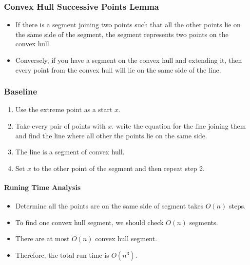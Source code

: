 \subsubsection{Convex Hull Successive Points Lemma}
\begin{itemize}
 \item If there is a segment joining two points such that all the other 
points lie on the same side of the segment, the segment represents two points 
on the convex hull.
 \item Conversely, if you have a segment on the convex hull and extending it, 
then every point from the convex hull will lie on the same side of the line.
\end{itemize}

\subsubsection{Baseline}
\begin{enumerate}
\item Use the extreme point as a start $x$.
\item Take every pair of points with $x$. write the equation for the line 
joining them and find the line where all other the points lie on the same side.
\item The line is a segment of convex hull.
\item Set $x$ to the other point of the segment and then repeat step 2.
\end{enumerate}

\paragraph{Runing Time Analysis}
\begin{itemize}
\item Determine all the points are on the same side of segment takes $O(n)$ 
steps.
\item To find one convex hull segment, we should check $O(n)$ segments.
\item There are at most $O(n)$ convex hull segment.
\item Therefore, the total run time is $O(n^3)$.
\end{itemize}

